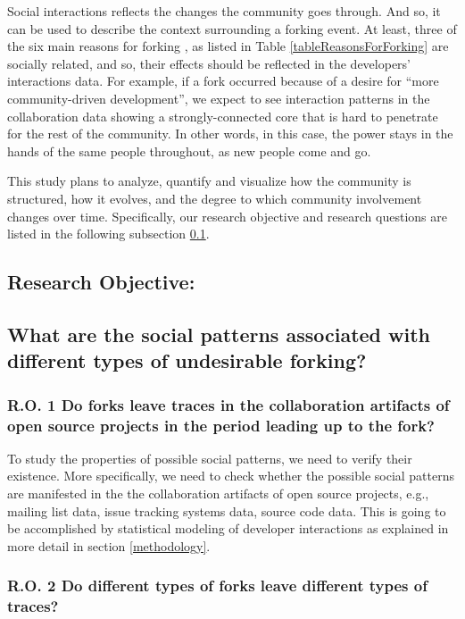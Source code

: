 \documentclass{report}
\begin{document}
Social interactions reflects the changes the community goes through. And so, it can be used to describe the context surrounding a forking event. At least, three of the six main reasons for forking \cite{Robles}, as listed in Table \ref{tableReasonsForForking} are socially related, and so, their effects should be reflected in the developers' interactions data. For example, if a fork occurred because of a desire for ``more community-driven development'', we expect to see interaction patterns in the collaboration data showing a strongly-connected core that is hard to penetrate for the rest of the community. In other words, in this case, the power stays in the hands of the same people throughout, as new people come and go. 

This study plans to analyze, quantify and visualize how the community is structured, how it evolves, and the degree to which community involvement changes over time.
Specifically, our research objective and research questions are listed in the following subsection \ref{ResearchObjective}.

\subsection{Research Objective:}
\label{ResearchObjective}
\subsection*{What are the social patterns associated with different types of undesirable forking?\\}

\subsubsection*{R.O. 1 \hspace{4 mm} Do forks leave traces in the collaboration artifacts of open source projects in the period leading up to the fork?\\}

To study the properties of possible social patterns, we need to verify their existence. More specifically, we need to check whether the possible social patterns are manifested in the the collaboration artifacts of open source projects, e.g., mailing list data, issue tracking systems data, source code data. This is going to be accomplished by statistical modeling of developer interactions as explained in more detail in section \ref{methodology}.

\subsubsection*{R.O. 2 \hspace{4 mm} Do different types of forks leave different types of traces?\\}
\end{document}

